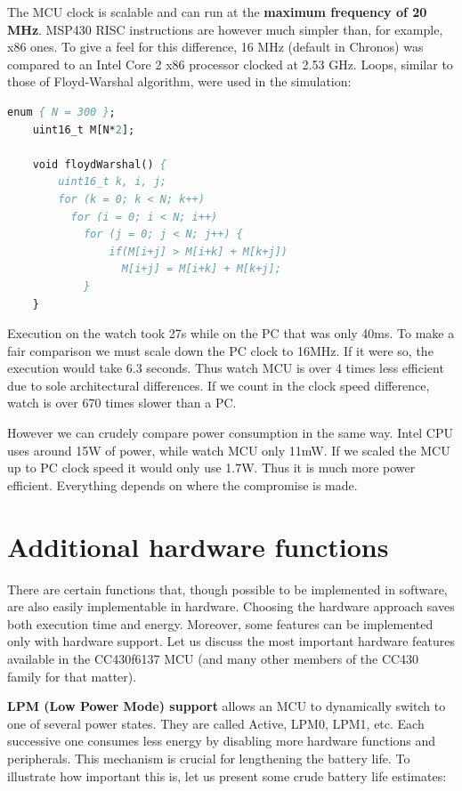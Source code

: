 The MCU clock is scalable and can run at the {\bf maximum frequency of
20 MHz}.  MSP430 RISC instructions are however much simpler than, for
example, x86 ones. To give a feel for this difference, 16 MHz (default
in Chronos) was compared to an Intel Core 2 x86 processor clocked at
2.53 GHz. Loops, similar to those of Floyd-Warshal algorithm, were used
in the simulation:

\begin{lstlisting}[numbers=none, language=Pascal]
    enum { N = 300 };
    uint16_t M[N*2];

    void floydWarshal() {
        uint16_t k, i, j;
        for (k = 0; k < N; k++)
          for (i = 0; i < N; i++)
            for (j = 0; j < N; j++) {
                if(M[i+j] > M[i+k] + M[k+j])
                  M[i+j] = M[i+k] + M[k+j];
            }
    }
\end{lstlisting}

Execution on the watch took 27s while on the PC that was only 40ms.
To make a fair comparison we must scale down the PC clock to 16MHz. If
it were so, the execution would take 6.3 seconds. Thus watch MCU
is over 4 times less efficient due to sole architectural differences.
If we count in the clock speed difference, watch is over 670 times
slower than a PC.

However we can crudely compare power consumption in the same way.
Intel CPU uses around 15W of power, while watch MCU only 11mW. If we
scaled the MCU up to PC clock speed it would only use 1.7W. Thus it is
much more power efficient. Everything depends on where the compromise
is made.

\section{Additional hardware functions}

There are certain functions that, though possible to be implemented in
software, are also easily implementable in hardware. Choosing the
hardware approach saves both execution time and energy. Moreover, some
features can be implemented only with hardware support. Let us discuss
the most important hardware features available in the CC430f6137 MCU
(and many other members of the CC430 family for that matter).

{\bf LPM (Low Power Mode) support} allows an MCU to dynamically switch to
one of several power states.  They are called Active, LPM0, LPM1, etc.
Each successive one consumes less energy by disabling more hardware
functions and peripherals. This mechanism is crucial for lengthening
the battery life. To illustrate how important this is, let us present
some crude battery life estimates:

